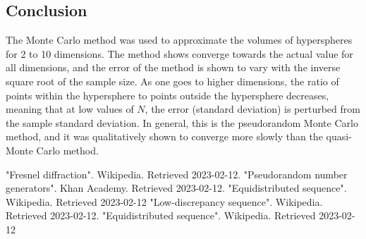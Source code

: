 \documentclass[hyphens,twocolumn,nobalancelastpage,aps,10pt,citeautoscript,longbibliography]{revtex4-2}
\begin{document}
\subsection{Conclusion}%
\label{sub:conclusion_2}

\noindent The Monte Carlo method was used to approximate the volumes of
hyperspheres for 2 to 10 dimensions. The method shows converge towards the
actual value for all dimensions, and the error of the method is shown to vary
with the inverse square root of the sample size. As one goes to higher
dimensions, the ratio of points within the hypersphere to points outside the
hypersphere decreases, meaning that at low values of $N$, the error (standard
deviation) is perturbed from the sample standard deviation. In general, this is
the pseudorandom Monte Carlo method, and it was qualitatively shown to converge
more slowly than the quasi-Monte Carlo method.

\begin{thebibliography}{2}

	 "Fresnel diffraction". Wikipedia. Retrieved 2023-02-12.
	 "Pseudorandom number generators". Khan Academy. Retrieved 2023-02-12.
	 "Equidistributed sequence". Wikipedia. Retrieved 2023-02-12
	 "Low-discrepancy sequence". Wikipedia. Retrieved 2023-02-12.
	 "Equidistributed sequence". Wikipedia. Retrieved 2023-02-12

\end{thebibliography}
\end{document}
